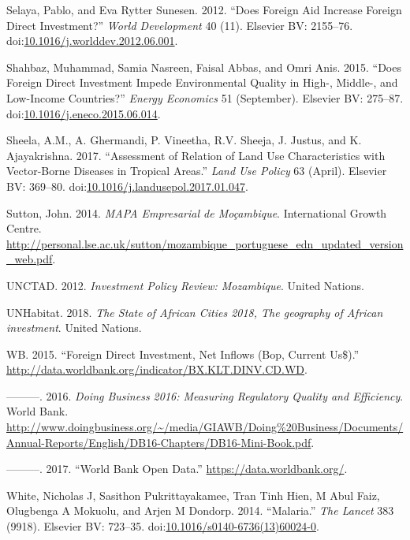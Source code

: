 \documentclass[]{article}
\begin{document}
\hypertarget{ref-Selaya_2012}{}
Selaya, Pablo, and Eva Rytter Sunesen. 2012. ``Does Foreign Aid Increase
Foreign Direct Investment?'' \emph{World Development} 40 (11). Elsevier
BV: 2155--76.
doi:\href{https://doi.org/10.1016/j.worlddev.2012.06.001}{10.1016/j.worlddev.2012.06.001}.

\hypertarget{ref-Shahbaz_2015}{}
Shahbaz, Muhammad, Samia Nasreen, Faisal Abbas, and Omri Anis. 2015.
``Does Foreign Direct Investment Impede Environmental Quality in High-,
Middle-, and Low-Income Countries?'' \emph{Energy Economics} 51
(September). Elsevier BV: 275--87.
doi:\href{https://doi.org/10.1016/j.eneco.2015.06.014}{10.1016/j.eneco.2015.06.014}.

\hypertarget{ref-Sheela_2017}{}
Sheela, A.M., A. Ghermandi, P. Vineetha, R.V. Sheeja, J. Justus, and K.
Ajayakrishna. 2017. ``Assessment of Relation of Land Use Characteristics
with Vector-Borne Diseases in Tropical Areas.'' \emph{Land Use Policy}
63 (April). Elsevier BV: 369--80.
doi:\href{https://doi.org/10.1016/j.landusepol.2017.01.047}{10.1016/j.landusepol.2017.01.047}.

\hypertarget{ref-Sutton2014}{}
Sutton, John. 2014. \emph{MAPA Empresarial de Moçambique}. International
Growth Centre.
\url{http://personal.lse.ac.uk/sutton/mozambique_portuguese_edn_updated_version_web.pdf}.

\hypertarget{ref-Unctad2012}{}
UNCTAD. 2012. \emph{Investment Policy Review: Mozambique}. United
Nations.

\hypertarget{ref-africa2018}{}
UNHabitat. 2018. \emph{The State of African Cities 2018, The geography
of African investment}. United Nations.

\hypertarget{ref-wbdata}{}
WB. 2015. ``Foreign Direct Investment, Net Inflows (Bop, Current
Us\$).'' \url{http://data.worldbank.org/indicator/BX.KLT.DINV.CD.WD}.

\hypertarget{ref-doingbusiness}{}
---------. 2016. \emph{Doing Business 2016: Measuring Regulatory Quality
and Efficiency}. World Bank.
\url{http://www.doingbusiness.org/~/media/GIAWB/Doing\%20Business/Documents/Annual-Reports/English/DB16-Chapters/DB16-Mini-Book.pdf}.

\hypertarget{ref-wbd}{}
---------. 2017. ``World Bank Open Data.''
\url{https://data.worldbank.org/}.

\hypertarget{ref-White2014}{}
White, Nicholas J, Sasithon Pukrittayakamee, Tran Tinh Hien, M Abul
Faiz, Olugbenga A Mokuolu, and Arjen M Dondorp. 2014. ``Malaria.''
\emph{The Lancet} 383 (9918). Elsevier BV: 723--35.
doi:\href{https://doi.org/10.1016/s0140-6736(13)60024-0}{10.1016/s0140-6736(13)60024-0}.
\end{document}
